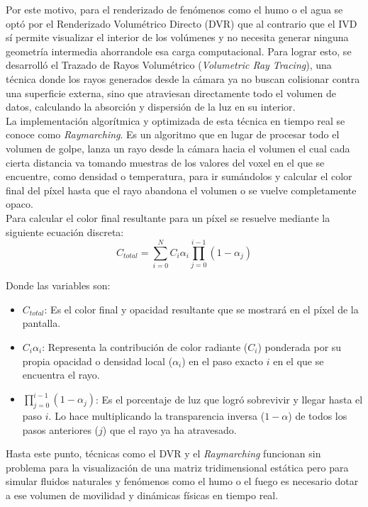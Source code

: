     Por este motivo, para el renderizado de fenómenos como el humo o el agua se optó por el Renderizado Volumétrico Directo (DVR) que al contrario que el IVD sí permite visualizar el interior de los volúmenes y no necesita generar ninguna geometría intermedia ahorrandole esa carga computacional. Para lograr esto, se desarrolló el Trazado de Rayos Volumétrico (\textit{Volumetric Ray Tracing}), una técnica donde los rayos generados desde la cámara ya no buscan colisionar contra una superficie externa, sino que atraviesan directamente todo el volumen de datos, calculando la absorción y dispersión de la luz en su interior\cite{kaufman2005overview}.\\

    La implementación algorítmica y optimizada de esta técnica en tiempo real se conoce como \textit{Raymarching}. Es un algoritmo que en lugar de procesar todo el volumen de golpe, lanza un rayo desde la cámara hacia el volumen el cual cada cierta distancia va tomando muestras de los valores del voxel en el que se encuentre, como densidad o temperatura, para ir sumándolos y calcular el color final del píxel hasta que el rayo abandona el volumen o se vuelve completamente opaco\cite{max2002optical}.\\

    Para calcular el color final resultante para un píxel se resuelve mediante la siguiente ecuación discreta:\\

    $$
    C_{total} = \sum_{i=0}^{N} C_i \alpha_i \prod_{j=0}^{i-1} (1 - \alpha_j)
    $$

    Donde las variables son:
    \begin{itemize}
        \item \textbf{$C_{total}$}: Es el color final y opacidad resultante que se mostrará en el píxel de la pantalla.
        \item \textbf{$C_i \alpha_i$}: Representa la contribución de color radiante ($C_i$) ponderada por su propia opacidad o densidad local ($\alpha_i$) en el paso exacto $i$ en el que se encuentra el rayo.
        \item \textbf{$\prod_{j=0}^{i-1} (1 - \alpha_j)$}: Es el porcentaje de luz que logró sobrevivir y llegar hasta el paso $i$. Lo hace multiplicando la transparencia inversa ($1 - \alpha$) de todos los pasos anteriores ($j$) que el rayo ya ha atravesado.
    \end{itemize}

    Hasta este punto, técnicas como el DVR y el \textit{Raymarching} funcionan sin problema para la visualización de una matriz tridimensional estática pero para simular fluidos naturales y fenómenos como el humo o el fuego es necesario dotar a ese volumen de movilidad y dinámicas físicas en tiempo real.\\

